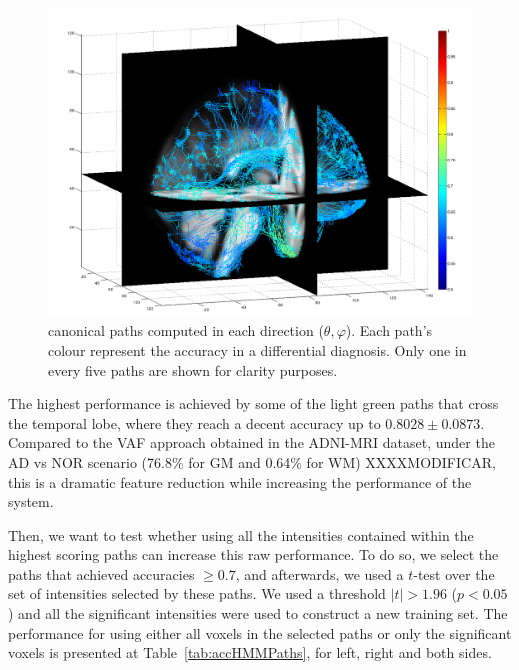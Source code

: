 \begin{figure}
	\begin{center}
		\includegraphics[width=\columnwidth]{Graphics/ch6/accuracyPaths2}
		\caption{canonical paths computed in each direction ($\theta,\varphi$). Each path's colour represent the accuracy in a differential diagnosis. Only one in every five paths are shown for clarity purposes.}
		\label{fig:accuracyMap}
	\end{center}
\end{figure}

The highest performance is achieved by some of the light green paths that cross the temporal lobe, where they reach a decent accuracy up to $0.8028\pm0.0873$. Compared to the \ac{VAF} approach obtained in the ADNI-MRI dataset, under the AD vs NOR scenario (76.8\% for \ac{GM} and 0.64\% for \ac{WM}) XXXXMODIFICAR, this is a dramatic feature reduction while increasing the performance of the system. 

Then, we want to test whether using all the intensities contained within the highest scoring paths can increase this raw performance. To do so, we select the paths that achieved accuracies $\ge0.7$, and afterwards, we used a $t$-test over the set of intensities selected by these paths. We used a threshold $|t|>1.96$ ($p<0.05$) and all the significant intensities were used to construct a new training set. The performance for using either all voxels in the selected paths or only the significant voxels is presented at Table~\ref{tab:accHMMPaths}, for left, right and both sides. 

